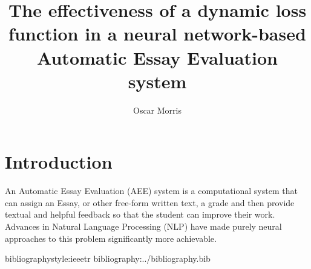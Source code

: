 \documentclass[a4paper]{article}
\author{Oscar Morris}
\date{}
\title{The effectiveness of a dynamic loss function in a neural network-based Automatic Essay Evaluation system}
\begin{document}
\maketitle

\section{Introduction}
\label{sec:orgbec978f}
An Automatic Essay Evaluation (AEE) system is a computational system that can assign an Essay, or other free-form written text, a grade and then provide textual and helpful feedback so that the student can improve their work. Advances in Natural Language Processing (NLP) have made purely neural approaches to this problem significantly more achievable.


bibliographystyle:ieeetr
bibliography:../bibliography.bib
\end{document}
